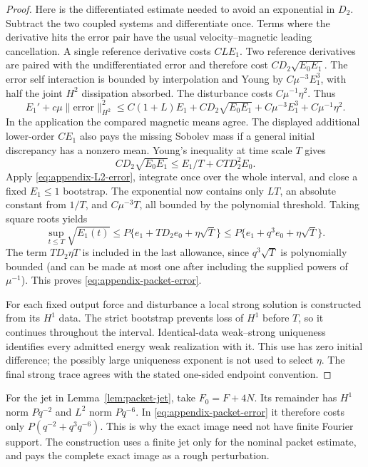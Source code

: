 \documentclass[11pt,a4paper]{amsart}
\theoremstyle{definition}
\theoremstyle{remark}
\numberwithin{equation}{section}
\newcommand{\norm}[1]{\lVert #1\rVert}
\begin{document}
\begin{proof}
Here is the differentiated estimate needed to avoid an exponential in
$D_2$.  Subtract the two coupled systems and differentiate once.  Terms
where the derivative hits the error pair have the usual velocity--magnetic
leading cancellation.  A single reference derivative costs $CL E_1$.
Two reference derivatives are paired with the undifferentiated error and
therefore cost $CD_2\sqrt{E_0E_1}$.  The error self interaction is bounded
by interpolation and Young by $C\mu^{-3}E_1^3$, with half the joint
$H^2$ dissipation absorbed.  The disturbance costs $C\mu^{-1}\eta^2$.
Thus
\begin{equation}\label{eq:appendix-H1-error}
 E_1'+c\mu\norm{\text{error}}_{H^2}^2
 \le C(1+L)E_1+CD_2\sqrt{E_0E_1}
            +C\mu^{-3}E_1^3+C\mu^{-1}\eta^2.
\end{equation}
In the application the compared magnetic means agree. The displayed
additional lower-order $CE_1$ also pays the missing Sobolev mass if a
general initial discrepancy has a nonzero mean. Young's inequality
at time scale $T$ gives
\[
 CD_2\sqrt{E_0E_1}\le E_1/T+CTD_2^2E_0.
\]
Apply \eqref{eq:appendix-L2-error}, integrate once over the whole interval,
and close a fixed $E_1\le1$ bootstrap.  The exponential now contains only
$LT$, an absolute constant from $1/T$, and $C\mu^{-3}T$, all bounded by
the polynomial threshold.  Taking square roots yields
\[
 \sup_{t\le T}\sqrt{E_1(t)}
 \le P\{e_1+TD_2e_0+\eta\sqrt T\}
 \le P\{e_1+q^3e_0+\eta\sqrt T\}.
\]
The term $TD_2\eta T$ is included in the last allowance, since
$q^3\sqrt T$ is polynomially bounded (and can be made at most one after
including the supplied powers of $\mu^{-1}$).  This proves
\eqref{eq:appendix-packet-error}.

For each fixed output force and disturbance a local strong solution is
constructed from its $H^1$ data.  The strict bootstrap prevents loss of
$H^1$ before $T$, so it continues throughout the interval.  Identical-data
weak--strong uniqueness identifies every admitted energy weak realization
with it.  This use has zero initial difference; the possibly large
uniqueness exponent is not used to select $\eta$.  The final strong trace
agrees with the stated one-sided endpoint convention.
\end{proof}

For the jet in Lemma~\ref{lem:packet-jet}, take $F_0=F+4N$.  Its remainder
has $H^1$ norm $Pq^{-2}$ and $L^2$ norm $Pq^{-6}$.  In
\eqref{eq:appendix-packet-error} it therefore costs only
$P(q^{-2}+q^3q^{-6})$.  This is why the exact image need not have finite
Fourier support.  The construction uses a finite jet only for the nominal
packet estimate, and pays the complete exact image as a rough perturbation.
\end{document}
